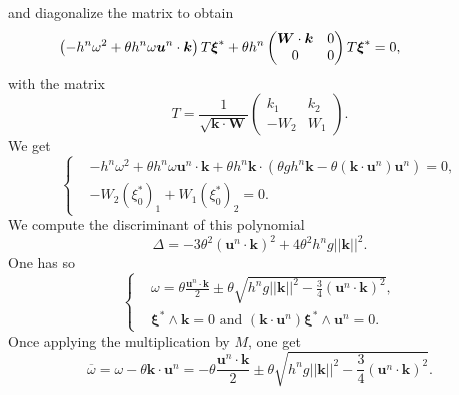 \documentclass[a4paper, 11pt]{article}
\begin{document}
and diagonalize the matrix to obtain
\begin{equation*}
\hspace*{-1.5cm}\left(-h^n\omega^2+\theta h^n\omega \boldsymbol{u}^n\cdot \boldsymbol{k}\right)T\boldsymbol{\xi}^*+\theta h^n \begin{pmatrix}\boldsymbol{W}\cdot \boldsymbol{k}&0\\0&0\end{pmatrix}T\boldsymbol{\xi}^*=0,
\end{equation*}
with the matrix
\begin{equation*}
T=\frac{1}{\sqrt{\boldsymbol{k}\cdot \boldsymbol{W}}}
\begin{pmatrix}
k_1&k_2\\-W_2&W_1
\end{pmatrix}.
\end{equation*}
We get
\begin{equation*}
\left\{
\begin{split}
&-h^n\omega^2+\theta h^n\omega \boldsymbol{u}^n\cdot \boldsymbol{k}+\theta h^n\boldsymbol{k}\cdot \left(\theta gh^n\boldsymbol{k}-\theta(\boldsymbol{k}\cdot \boldsymbol{u}^n)\boldsymbol{u}^n\right)=0,\\
&-W_2(\xi_0^*)_1+W_1(\xi_0^*)_2=0.
\end{split}
\right.
\end{equation*}
We compute the discriminant of this polynomial
\begin{equation*}
\Delta =-3\theta^2(\boldsymbol{u}^n\cdot \boldsymbol{k})^2+4\theta^2h^n g||\boldsymbol{k}||^2.
\end{equation*}
One has so
\begin{equation*}
\left\{
\begin{split}
&\omega =\theta\frac{\boldsymbol{u}^n\cdot \boldsymbol{k}}{2}\pm \theta\sqrt{h^ng||\boldsymbol{k}||^2-\frac{3}{4}(\boldsymbol{u}^n\cdot \boldsymbol{k})^2},\\
&\boldsymbol{\xi}^*\wedge\boldsymbol{k}=0 \text{\ and\ } (\boldsymbol{k}\cdot \boldsymbol{u}^n)\boldsymbol{\xi}^*\wedge\boldsymbol{u}^n=0.
\end{split}
\right.
\end{equation*}
Once applying the multiplication by $M$, one get
\begin{equation*}
\overline{\omega}=\omega-\theta\boldsymbol{k}\cdot \boldsymbol{u}^n=-\theta\frac{\boldsymbol{u}^n\cdot \boldsymbol{k}}{2}\pm\theta\sqrt{h^n g ||\boldsymbol{k}||^2-\frac{3}{4}(\boldsymbol{u}^n\cdot\boldsymbol{k})^2}.
\end{equation*}
\end{document}
